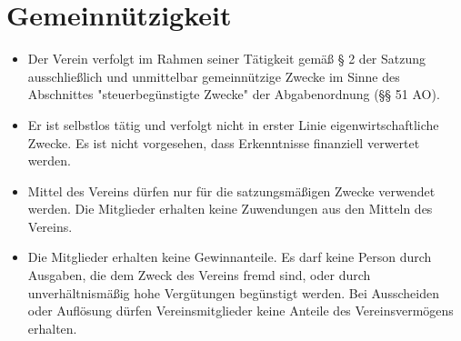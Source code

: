 \documentclass[a4paper,10pt]{article}
\begin{document}
\section{Gemeinnützigkeit}
  \begin{itemize}
   \item Der Verein verfolgt im Rahmen seiner Tätigkeit gemäß § 2 der Satzung ausschließlich und unmittelbar gemeinnützige Zwecke im Sinne des Abschnittes "steuerbegünstigte Zwecke" der Abgabenordnung (§§ 51 AO). 
   \item Er ist selbstlos tätig und verfolgt nicht in erster Linie eigenwirtschaftliche Zwecke. Es ist nicht vorgesehen, dass Erkenntnisse finanziell verwertet werden. 
   \item Mittel des Vereins dürfen nur für die satzungsmäßigen Zwecke verwendet werden. Die Mitglieder erhalten keine Zuwendungen aus den Mitteln des Vereins.
   \item Die Mitglieder erhalten keine Gewinnanteile. Es darf keine Person durch Ausgaben, die dem Zweck des Vereins fremd sind, oder durch unverhältnismäßig hohe Vergütungen begünstigt werden. Bei Ausscheiden oder Auflösung dürfen Vereinsmitglieder keine Anteile des Vereinsvermögens erhalten.
  \end{itemize}
\end{document}
